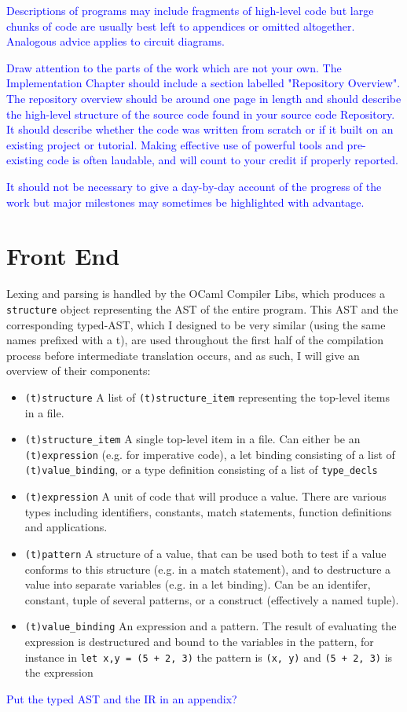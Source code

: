 \documentclass[12pt,twoside,notitlepage]{report}
\newcommand{\textinline}{\texttt}
\newcommand{\camlinline}{\texttt}
\newcommand\note[1]{\textcolor{blue}{#1}}
\begin{document}
\note{Descriptions of programs may include fragments of high-level code but large chunks of code are usually best left to appendices or omitted altogether. Analogous advice applies to circuit diagrams.}

\note{Draw attention to the parts of the work which are not your own. The Implementation Chapter should include a section labelled "Repository Overview". The repository overview should be around one page in length and should describe the high-level structure of the source code found in your source code Repository. It should describe whether the code was written from scratch or if it built on an existing project or tutorial. Making effective use of powerful tools and pre-existing code is often laudable, and will count to your credit if properly reported.}

\note{It should not be necessary to give a day-by-day account of the progress of the work but major milestones may sometimes be highlighted with advantage. }


\section{Front End}
Lexing and parsing is handled by the OCaml Compiler Libs, which produces a \textinline{structure} object representing the AST of the entire program. This AST and the corresponding typed-AST, which I designed to be very similar (using the same names prefixed with a t), are used throughout the first half of the compilation process before intermediate translation occurs, and as such, I will give an overview of their components:
\begin{itemize}
	\item \textinline{(t)structure} A list of \textinline{(t)structure_item} representing the top-level items in a file.
	\item \textinline{(t)structure_item} A single top-level item in a file. Can either be an \textinline{(t)expression} (e.g. for imperative code), a let binding consisting of a list of \textinline{(t)value_binding}, or a type definition consisting of a list of \textinline{type_decls}
	\item \textinline{(t)expression} A unit of code that will produce a value. There are various types including identifiers, constants, match statements, function definitions and applications.
	\item \textinline{(t)pattern} A structure of a value, that can be used both to test if a value conforms to this structure (e.g. in a match statement), and to destructure a value into separate variables (e.g. in a let binding). Can be an identifer, constant, tuple of several patterns, or a construct (effectively a named tuple).
	\item \textinline{(t)value_binding} An expression and a pattern. The result of evaluating the expression is destructured and bound to the variables in the pattern, for instance in \camlinline{let x,y = (5 + 2, 3)} the pattern is \camlinline{(x, y)} and \camlinline{(5 + 2, 3)} is the expression
\end{itemize}
\note{Put the typed AST and the IR in an appendix?}
\end{document}
